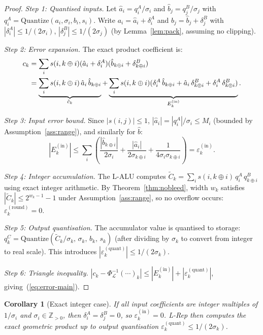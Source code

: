 \documentclass[11pt,a4paper]{article}
\theoremstyle{definition}
\theoremstyle{plain}
\newtheorem{corollary}{Corollary}[section]
\theoremstyle{remark}
\newcommand{\Quantize}{\mathrm{Quantize}}
\newcommand{\Unpack}{\Phi^{-1}_{\mathcal{L}}}
\begin{document}
\begin{proof}
\textit{Step 1: Quantised inputs.}
Let $\hat{a}_i = q_i^A / \sigma_i$ and $\hat{b}_j = q_j^B / \sigma_j$
with $q_i^A = \Quantize(a_i, \sigma_i, b_i, s_i)$.
Write $a_i = \hat{a}_i + \delta_i^A$ and
$b_j = \hat{b}_j + \delta_j^B$ with
$|\delta_i^A| \le 1/(2\sigma_i)$, $|\delta_j^B| \le 1/(2\sigma_j)$
(by Lemma~\ref{lem:pack}, assuming no clipping).

\textit{Step 2: Error expansion.}
The exact product coefficient is:
\begin{align}
  c_k
  &= \sum_i s(i, k\oplus i)
     (\hat{a}_i + \delta_i^A)(\hat{b}_{k\oplus i} + \delta_{k\oplus i}^B)
     \notag\\
  &= \underbrace{\sum_i s(i,k\oplus i)\,\hat{a}_i\,\hat{b}_{k\oplus i}}_{\tilde{c}_k}
   + \underbrace{\sum_i s(i,k\oplus i)
     (\delta_i^A\,\hat{b}_{k\oplus i}
      + \hat{a}_i\,\delta_{k\oplus i}^B
      + \delta_i^A\,\delta_{k\oplus i}^B)}_{E_k^{(\mathrm{in})}}.
     \label{eq:expand}
\end{align}

\textit{Step 3: Input error bound.}
Since $|s(i,j)| \le 1$, $|\hat{a}_i| = |q_i^A|/\sigma_i \le M_i$
(bounded by Assumption~\ref{ass:range}), and similarly for $\hat{b}$:
\[
  |E_k^{(\mathrm{in})}|
  \le \sum_i
    \left(\frac{|\hat{b}_{k\oplus i}|}{2\sigma_i}
     + \frac{|\hat{a}_i|}{2\sigma_{k\oplus i}}
     + \frac{1}{4\sigma_i\sigma_{k\oplus i}}\right)
  = \varepsilon_k^{(\mathrm{in})}.
\]

\textit{Step 4: Integer accumulation.}
The L-ALU computes
$\tilde{C}_k = \sum_i s(i,k\oplus i)\,q_i^A\,q_{k\oplus i}^B$
using exact integer arithmetic.
By Theorem~\ref{thm:nobleed}, width $w_k$ satisfies
$|\tilde{C}_k| \le 2^{w_k-1}-1$ under Assumption~\ref{ass:range},
so no overflow occurs: $\varepsilon_k^{(\mathrm{round})} = 0$.

\textit{Step 5: Output quantisation.}
The accumulator value is quantised to storage:
$q_k^C = \Quantize(\tilde{C}_k / \sigma_k,\, \sigma_k,\, b_k,\, s_k)$
(after dividing by $\sigma_k$ to convert from integer to real scale).
This introduces $|\varepsilon_k^{(\mathrm{quant})}| \le 1/(2\sigma_k)$.

\textit{Step 6: Triangle inequality.}
$|c_k - \Unpack(\cdots)_k|
 \le |E_k^{(\mathrm{in})}| + |\varepsilon_k^{(\mathrm{quant})}|$,
giving~(\ref{eq:error-main}).
\end{proof}

\begin{corollary}[Exact integer case]
\label{cor:exact}
If all input coefficients are integer multiples of $1/\sigma_i$ and
$\sigma_i \in \mathbb{Z}_{>0}$, then $\delta_i^A = \delta_j^B = 0$,
so $\varepsilon_k^{(\mathrm{in})} = 0$.
L-Rep then computes the exact geometric product up to output
quantisation $\varepsilon_k^{(\mathrm{quant})} \le 1/(2\sigma_k)$.
\end{corollary}
\end{document}
